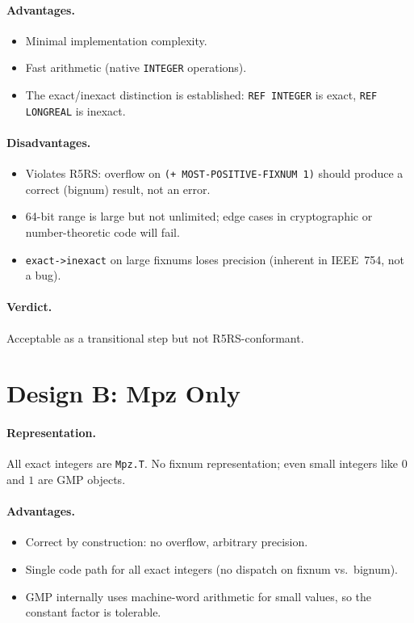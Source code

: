 \documentclass[12pt]{report}
\begin{document}
\paragraph{Advantages.}
\begin{itemize}
\item Minimal implementation complexity.
\item Fast arithmetic (native {\tt INTEGER} operations).
\item The exact/inexact distinction is established: {\tt REF INTEGER}
  is exact, {\tt REF LONGREAL} is inexact.
\end{itemize}

\paragraph{Disadvantages.}
\begin{itemize}
\item Violates R5RS: overflow on {\tt (+\ MOST-POSITIVE-FIXNUM\ 1)}
  should produce a correct (bignum) result, not an error.
\item 64-bit range is large but not unlimited; edge cases in
  cryptographic or number-theoretic code will fail.
\item {\tt exact->inexact} on large fixnums loses precision
  (inherent in IEEE~754, not a bug).
\end{itemize}

\paragraph{Verdict.}
Acceptable as a transitional step but not R5RS-conformant.

\section{Design B: Mpz Only}
\label{sec:mpz-only}

\paragraph{Representation.}
All exact integers are {\tt Mpz.T}.  No fixnum representation;
even small integers like $0$ and $1$ are GMP objects.

\paragraph{Advantages.}
\begin{itemize}
\item Correct by construction: no overflow, arbitrary precision.
\item Single code path for all exact integers (no dispatch on
  fixnum vs.\ bignum).
\item GMP internally uses machine-word arithmetic for small values,
  so the constant factor is tolerable.
\end{itemize}
\end{document}
